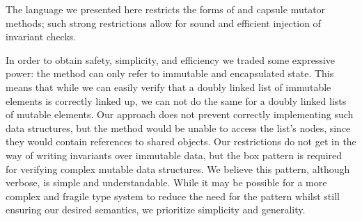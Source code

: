 





The language we presented here restricts the forms of \Q@invariant@ and capsule mutator methods;
such strong restrictions allow for sound and efficient injection of invariant checks. 


In order to obtain safety, simplicity, and efficiency we traded some expressive power:
the \Q@invariant@ method can only refer to immutable and encapsulated state.
This means that while we can easily verify that a doubly linked list of immutable elements
is correctly linked up,
we can not do the same for a doubly linked lists of mutable elements. Our approach does not prevent correctly implementing such data structures, but the \Q@invariant@ method would be unable to access the list's nodes, since they would contain \Q@mut@ references to shared objects.
Our restrictions do not get in the way of writing invariants over immutable data, but the box pattern is required for verifying complex mutable data structures. We believe this pattern, although verbose, is simple and understandable. While it may be possible for a more complex and fragile type system to reduce the need for the pattern whilst still ensuring our desired semantics, we prioritize simplicity and generality.



